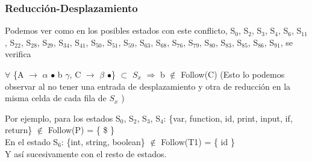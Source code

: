 \documentclass[a4paper, 12pt]{article}
\begin{document}
	\subsubsection*{Reducción-Desplazamiento}
	Podemos ver como en los posibles estados con este conflicto, S$_0$, S$_2$, S$_3$, S$_4$, S$_6$, S$_{11}$, S$_{22}$, S$_{28}$, S$_{29}$, S$_{34}$, S$_{41}$, S$_{50}$, S$_{51}$, S$_{59}$, S$_{63}$, S$_{68}$, S$_{76}$, S$_{79}$, S$_{80}$, S$_{83}$, S$_{85}$, S$_{86}$, S$_{91}$, se verifica
	
	$\forall$ \{A $\rightarrow$ $\alpha$ $\bullet$ b $\gamma$, C $\rightarrow$ $\beta$ $\bullet$\} $\subset$ $S_x$ $\Rightarrow$ b $\notin$ Follow(C) (Esto lo podemos observar al no tener una entrada de desplazamiento y otra de reducción en la misma celda de cada fila de $S_x$ )

	Por ejemplo, para los estados S$_0$,  S$_2$,  S$_3$,  S$_4$: \{var, function, id, print, input, if, return\} $\notin$ Follow(P) = \{ \$ \} \\
	En el estado S$_6$:  \{int, string, boolean\} $\notin$ Follow(T1) = \{ id \}\\
	Y así sucesivamente con el resto de estados.
\end{document}
